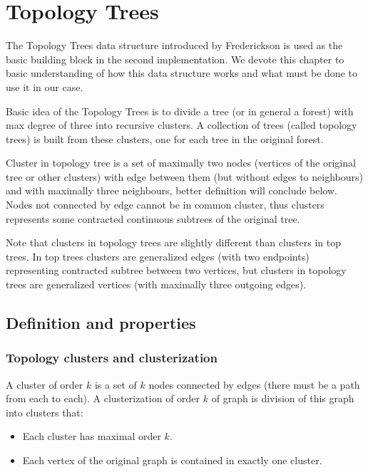 \chapter{Topology Trees}

The Topology Trees data structure introduced by Frederickson
\cite{DSforDynamicallyMaintainingRootedTrees} is used as the basic building
block in the second implementation. We devote this chapter to basic
understanding of how this data structure works and what must be done to use
it in our case.

Basic idea of the Topology Trees is to divide a tree (or in general a forest)
with max degree of three into recursive {\I clusters}. A collection of trees
(called {\I topology trees}) is built from these clusters, one for each tree in
the original forest.

Cluster in topology tree is a set of maximally two nodes (vertices of the
original tree or other clusters) with edge between them (but without edges to
neighbours) and with maximally three neighbours, better definition will conclude
below. Nodes not connected by edge cannot be in common cluster, thus clusters
represents some contracted continuous subtrees of the original tree.

Note that clusters in topology trees are slightly different than clusters in
top trees. In top trees clusters are generalized edges (with two endpoints)
representing contracted subtree between two vertices, but clusters in topology
trees are generalized vertices (with maximally three outgoing edges).

\section{Definition and properties}

\subsection{Topology clusters and clusterization}

A {\I cluster of order $k$} is a set of $k$ nodes connected by edges (there must
be a path from each to each). A {\I clusterization of order $k$} of graph is
division of this graph into clusters that:
\begin{itemize}
\item Each cluster has maximal order $k$.
\item Each vertex of the original graph is contained in exactly one cluster.
\end{itemize}

